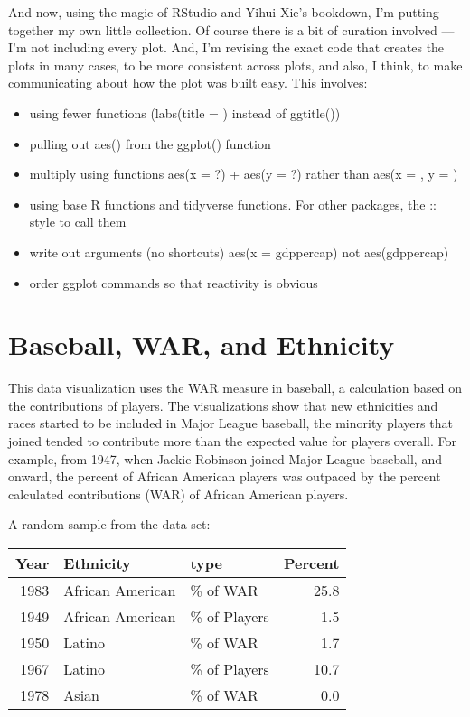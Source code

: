 \documentclass[]{book}
\providecommand{\tightlist}{%
  \setlength{\itemsep}{0pt}\setlength{\parskip}{0pt}}
\theoremstyle{definition}
\theoremstyle{definition}
\theoremstyle{definition}
\theoremstyle{remark}
\begin{document}
And now, using the magic of RStudio and Yihui Xie's bookdown, I'm
putting together my own little collection. Of course there is a bit of
curation involved --- I'm not including every plot. And, I'm revising
the exact code that creates the plots in many cases, to be more
consistent across plots, and also, I think, to make communicating about
how the plot was built easy. This involves:

\begin{itemize}
\tightlist
\item
  using fewer functions (labs(title = ) instead of ggtitle())
\item
  pulling out aes() from the ggplot() function
\item
  multiply using functions aes(x = ?) + aes(y = ?) rather than aes(x = ,
  y = )
\item
  using base R functions and tidyverse functions. For other packages,
  the :: style to call them
\item
  write out arguments (no shortcuts) aes(x = gdppercap) not
  aes(gdppercap)
\item
  order ggplot commands so that reactivity is obvious
\end{itemize}

\chapter{Baseball, WAR, and Ethnicity}\label{baseball-war-and-ethnicity}

This data visualization uses the WAR measure in baseball, a calculation
based on the contributions of players. The visualizations show that new
ethnicities and races started to be included in Major League baseball,
the minority players that joined tended to contribute more than the
expected value for players overall. For example, from 1947, when Jackie
Robinson joined Major League baseball, and onward, the percent of
African American players was outpaced by the percent calculated
contributions (WAR) of African American players.

A random sample from the data set:

\begin{tabular}{r|l|l|r}
\hline
Year & Ethnicity & type & Percent\\
\hline
1983 & African American & \% of WAR & 25.8\\
\hline
1949 & African American & \% of Players & 1.5\\
\hline
1950 & Latino & \% of WAR & 1.7\\
\hline
1967 & Latino & \% of Players & 10.7\\
\hline
1978 & Asian & \% of WAR & 0.0\\
\hline
\end{tabular}
\end{document}
